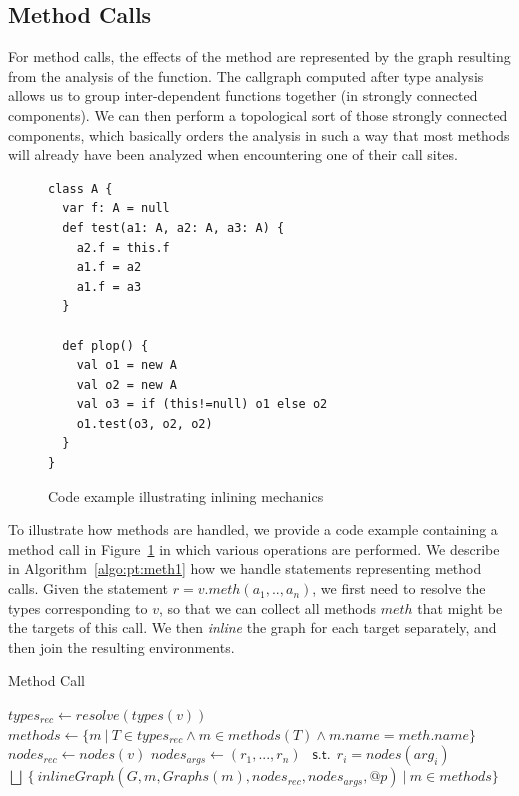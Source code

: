 \subsection{Method Calls}
\label{sec:pt:inlining}
For method calls, the effects of the method are represented by the graph
resulting from the analysis of the function. The callgraph computed after
type analysis allows us to group inter-dependent functions together (in
strongly connected components). We can then perform a topological sort of
those strongly connected components, which basically orders the analysis
in such a way that most methods will already have been analyzed when
encountering one of their call sites.

\begin{figure}[h]
    \centering
\begin{lstlisting}
class A {
  var f: A = null
  def test(a1: A, a2: A, a3: A) {
    a2.f = this.f
    a1.f = a2
    a1.f = a3
  }

  def plop() {
    val o1 = new A
    val o2 = new A
    val o3 = if (this!=null) o1 else o2
    o1.test(o3, o2, o2)
  }
}
\end{lstlisting}
    \caption{Code example illustrating inlining mechanics}
    \label{fig:pt:inlinecode}
\end{figure}

To illustrate how methods are handled, we provide a code example containing a
method call in Figure~\ref{fig:pt:inlinecode} in which various operations are
performed. We describe in Algorithm~\ref{algo:pt:meth1} how we handle
statements representing method calls. Given the statement $r = v.meth(a_1, ..,
a_n)$, we first need to resolve the types corresponding to $v$, so that we can
collect all methods $meth$ that might be the targets of this call. We then
\emph{inline} the graph for each target separately, and then join the resulting
environments.

\begin{algorithm}
\caption{Method Call}\label{algo:pt:meth1}
\begin{algorithmic}[1]
    \State $types_{rec} \gets resolve(types(v))$
    \State $methods \gets \{ m ~|~ T \in types_{rec} \land m \in methods(T) \land m.name = meth.name \}$
    \State $nodes_{rec} \gets nodes(v)$
    \State $nodes_{args} \gets (r_1, ..., r_n) ~~\textsf{ s.t.}~~ r_i = nodes(arg_i)$
    \State \Return $\bigsqcup ~\{~ inlineGraph(G, m, Graphs(m), nodes_{rec}, nodes_{args}, @p) ~|~ m \in methods \}$
\EndFunction
\end{algorithmic}
\end{algorithm}


